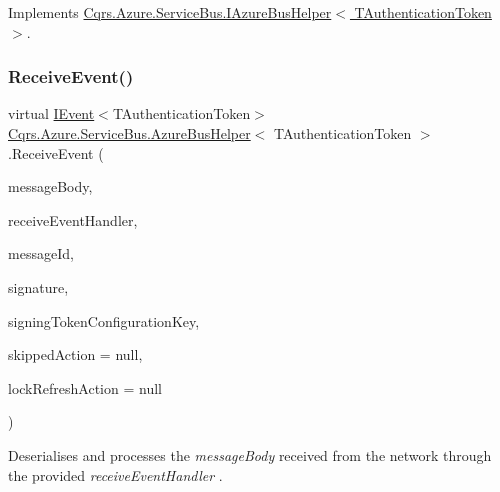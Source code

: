 Implements \hyperlink{interfaceCqrs_1_1Azure_1_1ServiceBus_1_1IAzureBusHelper_ac68564203a196da2eb860e9cc11f8f4d_ac68564203a196da2eb860e9cc11f8f4d}{Cqrs.\+Azure.\+Service\+Bus.\+I\+Azure\+Bus\+Helper$<$ T\+Authentication\+Token $>$}.

\mbox{\label{classCqrs_1_1Azure_1_1ServiceBus_1_1AzureBusHelper_ab1feda11b64b606f36d517ce5ce8ca59_ab1feda11b64b606f36d517ce5ce8ca59}} 
\subsubsection{\texorpdfstring{Receive\+Event()}{ReceiveEvent()}}
{\footnotesize\ttfamily virtual \hyperlink{interfaceCqrs_1_1Events_1_1IEvent}{I\+Event}$<$T\+Authentication\+Token$>$ \hyperlink{classCqrs_1_1Azure_1_1ServiceBus_1_1AzureBusHelper}{Cqrs.\+Azure.\+Service\+Bus.\+Azure\+Bus\+Helper}$<$ T\+Authentication\+Token $>$.Receive\+Event (\begin{DoxyParamCaption}\item[{string}]{message\+Body,  }\item[{Func$<$ \hyperlink{interfaceCqrs_1_1Events_1_1IEvent}{I\+Event}$<$ T\+Authentication\+Token $>$, bool?$>$}]{receive\+Event\+Handler,  }\item[{string}]{message\+Id,  }\item[{string}]{signature,  }\item[{string}]{signing\+Token\+Configuration\+Key,  }\item[{Action}]{skipped\+Action = {\ttfamily null},  }\item[{Action}]{lock\+Refresh\+Action = {\ttfamily null} }\end{DoxyParamCaption})\hspace{0.3cm}{\ttfamily [virtual]}}



Deserialises and processes the {\itshape message\+Body}  received from the network through the provided {\itshape receive\+Event\+Handler} . 


